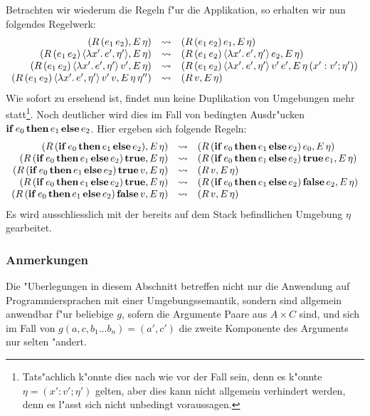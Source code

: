 \documentclass[12pt,a4paper]{article}
\begin{document}
Betrachten wir wiederum die Regeln f"ur die Applikation, so erhalten wir nun folgendes Regelwerk:
\[\begin{array}{rcl}
  (R\,({e_1}\,{e_2}),E\,\eta)
  &\rightsquigarrow& (R\,({e_1}\,{e_2})\,e_1,E\,\eta) \\
  (R\,({e_1}\,{e_2})\,\langle{\lambda{x'}.\,{e'}},{\eta'}\rangle,E\,\eta)
  &\rightsquigarrow& (R\,({e_1}\,{e_2})\,\langle{\lambda{x'}.\,{e'}},{\eta'}\rangle\,e_2,E\,\eta) \\
  (R\,({e_1}\,{e_2})\,\langle{\lambda{x'}.\,{e'}},{\eta'}\rangle\,v',E\,\eta)
  &\rightsquigarrow& (R\,({e_1}\,{e_2})\,\langle{\lambda{x'}.\,{e'}},{\eta'}\rangle\,v'\,e',E\,\eta\,(x':v';\eta')) \\
  (R\,({e_1}\,{e_2})\,\langle{\lambda{x'}.\,{e'}},{\eta'}\rangle\,v'\,v,E\,\eta\,\eta'')
  &\rightsquigarrow& (R\,v,E\,\eta)
\end{array}\]
Wie sofort zu ersehend ist, findet nun keine Duplikation von Umgebungen mehr statt\footnote{Tats"achlich
k"onnte dies nach wie vor der Fall sein, denn es k"onnte $\eta = (x':v';\eta')$ gelten, aber dies kann
nicht allgemein verhindert werden, denn es l"asst sich nicht unbedingt voraussagen.}. Noch deutlicher
wird dies im Fall von bedingten Ausdr"ucken $\mathbf{if}\,{e_0}\,\mathbf{then}\,{e_1}\,\mathbf{else}\,{e_2}$. Hier ergeben sich folgende Regeln:
\[\begin{array}{rcl}
  (R\,(\mathbf{if}\,{e_0}\,\mathbf{then}\,{e_1}\,\mathbf{else}\,{e_2}),E\,\eta)
  &\rightsquigarrow& (R\,(\mathbf{if}\,{e_0}\,\mathbf{then}\,{e_1}\,\mathbf{else}\,{e_2})\,e_0,E\,\eta) \\
  (R\,(\mathbf{if}\,{e_0}\,\mathbf{then}\,{e_1}\,\mathbf{else}\,{e_2})\,\mathbf{true},E\,\eta)
  &\rightsquigarrow& (R\,(\mathbf{if}\,{e_0}\,\mathbf{then}\,{e_1}\,\mathbf{else}\,{e_2})\,\mathbf{true}\,e_1,E\,\eta) \\
  (R\,(\mathbf{if}\,{e_0}\,\mathbf{then}\,{e_1}\,\mathbf{else}\,{e_2})\,\mathbf{true}\,v,E\,\eta)
  &\rightsquigarrow& (R\,v,E\,\eta) \\
  (R\,(\mathbf{if}\,{e_0}\,\mathbf{then}\,{e_1}\,\mathbf{else}\,{e_2})\,\mathbf{true},E\,\eta)
  &\rightsquigarrow& (R\,(\mathbf{if}\,{e_0}\,\mathbf{then}\,{e_1}\,\mathbf{else}\,{e_2})\,\mathbf{false}\,e_2,E\,\eta) \\
  (R\,(\mathbf{if}\,{e_0}\,\mathbf{then}\,{e_1}\,\mathbf{else}\,{e_2})\,\mathbf{false}\,v,E\,\eta)
  &\rightsquigarrow& (R\,v,E\,\eta) \\
\end{array}\]
Es wird ausschliesslich mit der bereits auf dem Stack befindlichen Umgebung $\eta$ gearbeitet.


\subsubsection{Anmerkungen}

Die "Uberlegungen in diesem Abschnitt betreffen nicht nur die Anwendung auf Programmiersprachen mit einer
Umgebungssemantik, sondern sind allgemein anwendbar f"ur beliebige $g$, sofern die Argumente Paare aus
$A \times C$ sind, und sich im Fall von $g(a,c,b_1 \ldots b_n) = (a',c')$ die zweite Komponente des
Arguments nur selten "andert.
\end{document}
